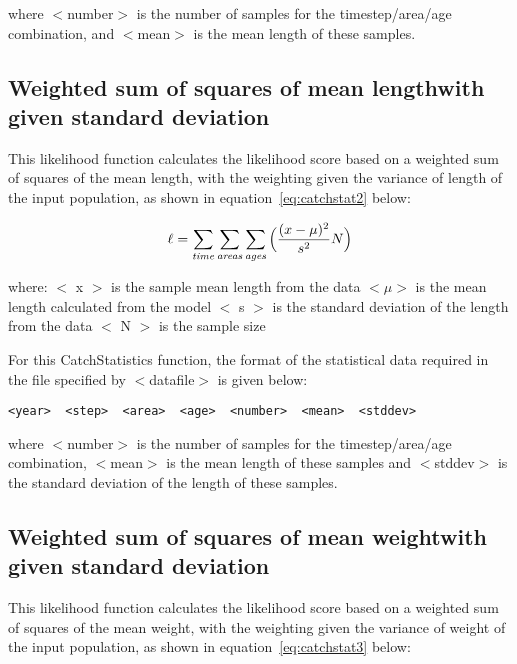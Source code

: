 \documentclass [a4paper, 10pt]{book}
\begin{document}
where $<$number$>$ is the number of samples for the timestep/area/age combination, and $<$mean$>$ is the mean length of these samples.

\subsection{Weighted sum of squares of mean length\newline with given standard deviation}
This likelihood function calculates the likelihood score based on a weighted sum of squares of the mean length, with the weighting given the variance of length of the input population, as shown in  equation~\ref{eq:catchstat2} below:

\begin{equation}\label{eq:catchstat2}
\ell = \sum_{\it time}\sum_{\it areas}\sum_{\it ages} \Big(\frac{(x-\mu)^2} {s^2} N\Big)
\end{equation}

where:\newline
$<$ x $>$ is the sample mean length from the data\newline
$<\mu>$ is the mean length calculated from the model\newline
$<$ s $>$ is the standard deviation of the length from the data\newline
$<$ N $>$ is the sample size

\bigskip
For this CatchStatistics function, the format of the statistical data required in the file specified by $<$datafile$>$ is given below:

{\small\begin{verbatim}
<year>  <step>  <area>  <age>  <number>  <mean>  <stddev>
\end{verbatim}}

where $<$number$>$ is the number of samples for the timestep/area/age combination, $<$mean$>$ is the mean length of these samples and $<$stddev$>$ is the standard deviation of the length of these samples.

\subsection{Weighted sum of squares of mean weight\newline with given standard deviation}
This likelihood function calculates the likelihood score based on a weighted sum of squares of the mean weight, with the weighting given the variance of weight of the input population, as shown in equation~\ref{eq:catchstat3} below:
\end{document}
